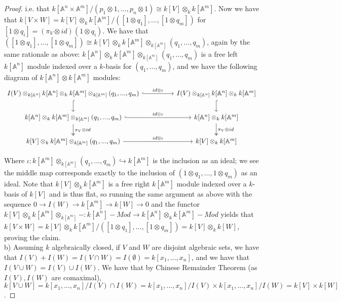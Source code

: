 \documentclass{article}
\newcommand{\bb}[1]{\mathbb{#1}}
\newcommand{\iso}{\cong}
\begin{document}
\begin{proof}
i.e. that $k[\bb{A}^{n}\times \bb{A}^{m}]/(p_{1}\otimes 1,...,p_{n} \otimes 1) \iso k[V] \otimes_{k}k[\bb{A}^{m}]$. Now we have that $k[V \times W] = k[V] \otimes_{k} k[\bb{A}^{m}]/([1 \otimes q_{1}],...,[1\otimes q_{m}])$ for $[1 \otimes q_{i}] = (\pi_{V}\otimes id)(1 \otimes q_{i})$. We have that $([1 \otimes q_{1}],...,[1\otimes q_{m}]) \iso k[V]\otimes_{k}k[\bb{A}^{m}] \otimes_{k[\bb{A}^{m}]}(q_{1},...,q_{m})$, again by the same rationale as above: $k[\bb{A}^{n}] \otimes_{k} k[\bb{A}^{m}] \otimes_{k[\bb{A}^{m}]}(q_{1},...,q_{m})$ is a free left $k[\bb{A}^{n}]$ module indexed over a $k$-basis for $(q_{1},...,q_{m})$, and we have the following diagram of $k[\bb{A}^{n}] \otimes k[\bb{A}^{m}]$ modules:
\[
\begin{tikzcd}
{I(V) \otimes_{k[\bb{A}^{n}]} k[\bb{A}^{n}] \otimes_{k} k[\bb{A}^{m}] \otimes_{k[\bb{A}^{m}]}(q_{1},...,q_{m})} \arrow[d, hook] \arrow[rr, "id \otimes \iota", hook] &  & {I(V) \otimes_{k[\bb{A}^{n}]} k[\bb{A}^{n}] \otimes_{k} k[\bb{A}^{m}]} \arrow[d, hook]                                     \\
k[\bb{A}^{n}] \otimes_{k} k[\bb{A}^{m}] \otimes_{k[\bb{A}^{m}]}(q_{1},...,q_{m}) \arrow[d, "\pi_{V} \otimes id", two heads] \arrow[rr, "id \otimes \iota", hook]   &  & k[\bb{A}^{n}] \otimes_{k} k[\bb{A}^{m}] \arrow[d, "\pi_{V} \otimes id", two heads] \\
{k[V] \otimes_{k} k[\bb{A}^{m}] \otimes_{k[\bb{A}^{m}]}(q_{1},...,q_{m})} \arrow[rr, "id \otimes \iota"]                                                       &  & {k[V] \otimes_{k} k[\bb{A}^{m}]}                                                                                          
\end{tikzcd}
\]

Where $\iota: k[\bb{A}^{m}] \otimes_{k[\bb{A}^{m}]} (q_{1},...,q_{m}) \hookrightarrow k[\bb{A}^{m}]$ is the inclusion as an ideal; we see the middle map corresponds exactly to the inclusion of $(1 \otimes q_{1},...,1 \otimes q_{m})$ as an ideal. Note that $k[V] \otimes_{k} k[\bb{A}^{m}]$ is a free right $k[\bb{A}^{m}]$ module indexed over a $k$-basis of $k[V]$ and is thus flat, so running the same argument as above with the sequence $0 \to I(W) \to k[\bb{A}^{m}] \to k[W] \to 0$ and the functor $k[V] \otimes_{k} k[\bb{A}^{m}] \otimes_{k[\bb{A}^{m}]} - : k[\bb{A}^{n}]-Mod \to k[\bb{A}^{n}]\otimes_{k}k[\bb{A}^{m}] - Mod$ yields that $k[V \times W] = k[V] \otimes_{k} k[\bb{A}^{m}]/([1 \otimes q_{1}],...,[1\otimes q_{m}]) = k[V] \otimes_{k} k[W]$, proving the claim.  
  \\
  
  b) Assuming $k$ algebraically closed, if $V$ and $W$ are disjoint algebraic sets, we have that $I(V) + I(W) =  I(V \cap W) =  I(\emptyset) = k[x_{1},...,x_{n}]$, and we have that $I(V \cup W) = I(V) \cup I(W)$. We have that by Chinese Remainder Theorem (as $I(V), I(W)$ are comaximal), $k[V \cup W] = k[x_{1},...,x_{n}]/I(V)\cap I(W) = k[x_{1},...,x_{n}]/I(V) \times k[x_{1},...,x_{n}]/I(W) = k[V] \times k[W]$.
\end{proof}
\end{document}
